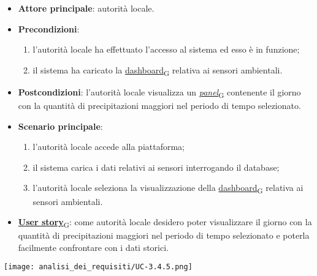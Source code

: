 \newpage
{}
\begin{itemize}
	\item \textbf{Attore principale}: autorità locale.
	\item \textbf{Precondizioni}:
	      \begin{enumerate}
		      \item l'autorità locale ha effettuato l'accesso al sistema ed esso è in funzione;
		      \item il sistema ha caricato la \href{https://7last.github.io/docs/pb/documentazione-interna/glossario\#dashboard}{dashboard\textsubscript{G}} relativa ai sensori ambientali.
	      \end{enumerate}
	\item \textbf{Postcondizioni}: l'autorità locale visualizza un \href{https://7last.github.io/docs/pb/documentazione-interna/glossario\#panel}{\textit{panel}\textsubscript{G}} contenente il giorno con la quantità di precipitazioni maggiori nel periodo di tempo selezionato.
	\item \textbf{Scenario principale}:
	      \begin{enumerate}
		      \item l'autorità locale accede alla piattaforma;
		      \item il sistema carica i dati relativi ai sensori interrogando il database;
		      \item l'autorità locale seleziona la visualizzazione della \href{https://7last.github.io/docs/pb/documentazione-interna/glossario\#dashboard}{dashboard\textsubscript{G}} relativa ai sensori ambientali.
	      \end{enumerate}
	\item \href{https://7last.github.io/docs/pb/documentazione-interna/glossario\#user-story}{\textbf{User story}\textsubscript{G}}:
	      come autorità locale desidero poter visualizzare il giorno con la quantità di precipitazioni maggiori nel periodo di tempo selezionato
	      e poterla facilmente confrontare con i dati storici.
\end{itemize}
\begin{center}
	\texttt{[image: analisi\_dei\_requisiti/UC-3.4.5.png]}
\end{center}

